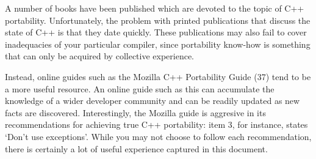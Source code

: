 A number of books have been published which are devoted to the topic of C++ portability. Unfortunately, the problem with printed publications that discuss the state of C++ is that they date quickly. These publications may also fail to cover inadequacies of your particular compiler, since portability know-how is something that can only be acquired by collective experience.

Instead, online guides such as the Mozilla C++ Portability Guide (37) tend to be a more useful resource. An online guide such as this can accumulate the knowledge of a wider developer community and can be readily updated as new facts are discovered. Interestingly, the Mozilla guide is aggresive in its recommendations for achieving true C++ portability: item 3, for instance, states `Don't use exceptions'. While you may not choose to follow each recommendation, there is certainly a lot of useful experience captured in this document. 


